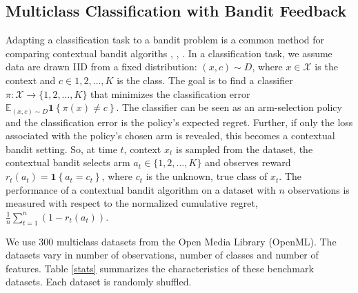 \documentclass[letterpaper]{article} %
\def\X{\mathcal{X}}
\def\E{\mathbb{E}}
\begin{document}
\subsection{Multiclass Classification with Bandit Feedback}\label{subsec:multi_class}

Adapting a classification task to a bandit problem is a common method for comparing contextual bandit algoriths \cite{dudik-offline-1}, \cite{agarwal-ilovetoconbandits}, \cite{bietti2018contextual}. In a classification task, we assume data are drawn IID from a fixed distribution: $(x, c) \sim D$, where $x \in \X$ is the context and $c \in {1, 2, \dots, K}$ is the class. The goal is to find a classifier $\pi: \X \rightarrow \{1, 2, \dots, K\}$ that minimizes the classification error $\E_{(x, c) \sim D}\mathbf{1}\left\{\pi(x) \neq c\right\}$. The classifier can be seen as an arm-selection policy and the classification error is the policy's expected regret. Further, if only the loss associated with the policy's chosen arm is revealed, this becomes a contextual bandit setting. So, at time $t$, context $x_t$ is sampled from the dataset, the contextual bandit selects arm $a_t \in \{1, 2, \dots, K\}$ and observes reward $r_t(a_t) = \mathbf{1}\left\{a_t = c_t\right\}$, where $c_t$ is the unknown, true class of $x_t$. 
The performance of a contextual bandit algorithm on a dataset with $n$ observations is measured with respect to the normalized cumulative regret, $\frac{1}{n} \sum_{t =1}^n{\left(1 - r_t(a_t)\right)}$.

We use 300 multiclass datasets from the Open Media Library (OpenML). The datasets vary in number of observations, number of classes and number of features. Table \ref{stats} summarizes the characteristics of these benchmark datasets. Each dataset is randomly shuffled. 
\end{document}
